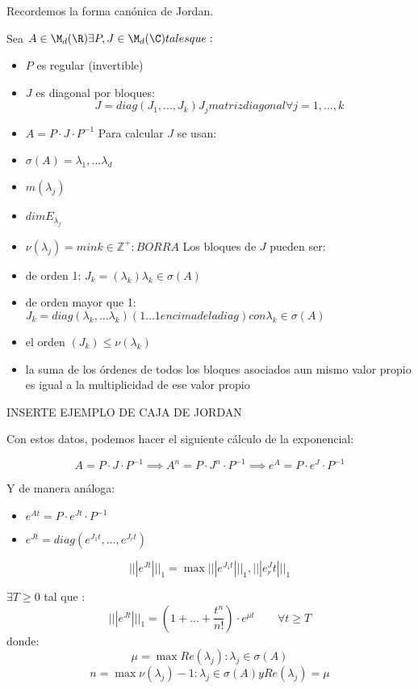 Recordemos la forma canónica de Jordan.

Sea $A \in \M_d(\R) \exists P, J \in \M_d(\C) tales que:$
\begin{itemize}
\item $P$ es regular (invertible)
\item $J$ es diagonal por bloques:
\begin{equation}
J=diag(J_1,...,J_k) J_j matriz diagonal \forall j=1,...,k
\end{equation}
\item $A=P\cdot J\cdot P^{-1}$
Para calcular $J$ se usan:
\item $\sigma(A)={\lambda_1,...\lambda_d}$
\item $m(\lambda_j)$
\item $dim E_{\lambda_j}$
\item $\nu(\lambda_j)=min{k\in\mathbb{Z}^+: BORRA}$
Los bloques de $J$ pueden ser:
\item de orden 1: $J_k=(\lambda_k) \lambda_k \in \sigma(A)$
\item de orden mayor que 1: $J_k=diag(\lambda_k,...\lambda_k) (1...1 encima de la diag) con \lambda_k \in \sigma(A)$
\item el orden $(J_k) \leq \nu(\lambda_k)$
\item la suma de los órdenes de todos los bloques asociados aun mismo valor propio es igual a la multiplicidad de ese valor propio
\end{itemize}

INSERTE EJEMPLO DE CAJA DE JORDAN

Con estos datos, podemos hacer el siguiente cálculo de la exponencial:

$$A=P\cdot J \cdot P^{-1} \implies A^n=P \cdot J^n \cdot P^{-1} \implies e^A=P \cdot e^J \cdot P^{-1}$$

Y de manera análoga:
\begin{itemize}
\item $e^{At}=P \cdot e^{Jt} \cdot P^{-1}$
\item $e^{Jt}=diag(e^{J_1t},...,e^{J_rt} )$
\end{itemize}


\begin{lema}
$$|||e^{Jt}|||_1=\max{|||e^{J_1t}|||_1,|||e^J_rt|||_1}$$
\end{lema}

\begin{lema}
$\exists T \geq 0 $ tal que :
$$|||e^{Jt}|||_1=\left(1+...+\frac{t^n}{n!}\right)\cdot e^{\mu t} \qquad \forall t \geq T$$
donde:
$$\mu=\max{Re(\lambda_j):\lambda_j\in \sigma(A)}$$
$$n=\max{\nu(\lambda_j)-1 : \lambda_j\in \sigma(A) y Re(\lambda_j)=\mu}$$
\end{lema}

